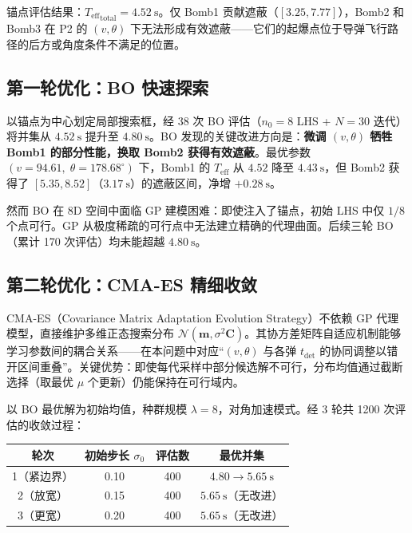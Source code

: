 \documentclass[12pt,a4paper]{ctexart}
\newcommand{\tdet}{t_{\text{det}}}
\newcommand{\Teff}{T_{\text{eff}}}
\begin{document}
锚点评估结果：${\Teff}_{\text{total}} = 4.52\ \mathrm{s}$。仅 Bomb1 贡献遮蔽（$[3.25, 7.77]$），Bomb2 和 Bomb3 在 P2 的 $(v,\theta)$ 下无法形成有效遮蔽——它们的起爆点位于导弹飞行路径的后方或角度条件不满足的位置。

\subsection{第一轮优化：BO 快速探索}

以锚点为中心划定局部搜索框，经 38 次 BO 评估（$n_0=8$ LHS + $N=30$ 迭代）将并集从 $4.52\ \mathrm{s}$ 提升至 $4.80\ \mathrm{s}$。BO 发现的关键改进方向是：\textbf{微调 $(v,\theta)$ 牺牲 Bomb1 的部分性能，换取 Bomb2 获得有效遮蔽}。最优参数 $(v=94.61,\; \theta=178.68^\circ)$ 下，Bomb1 的 $\Teff$ 从 $4.52$ 降至 $4.43\ \mathrm{s}$，但 Bomb2 获得了 $[5.35, 8.52]$（$3.17\ \mathrm{s}$）的遮蔽区间，净增 $+0.28\ \mathrm{s}$。

然而 BO 在 8D 空间中面临 GP 建模困难：即使注入了锚点，初始 LHS 中仅 $1/8$ 个点可行。GP 从极度稀疏的可行点中无法建立精确的代理曲面。后续三轮 BO（累计 170 次评估）均未能超越 $4.80\ \mathrm{s}$。

\subsection{第二轮优化：CMA-ES 精细收敛}

CMA-ES（Covariance Matrix Adaptation Evolution Strategy）不依赖 GP 代理模型，直接维护多维正态搜索分布 $\mathcal{N}(\mathbf{m}, \sigma^2\mathbf{C})$。其协方差矩阵自适应机制能够学习参数间的耦合关系——在本问题中对应``$(v,\theta)$ 与各弹 $\tdet$ 的协同调整以错开区间重叠''。关键优势：即使每代采样中部分候选解不可行，分布均值通过截断选择（取最优 $\mu$ 个更新）仍能保持在可行域内。

以 BO 最优解为初始均值，种群规模 $\lambda = 8$，对角加速模式。经 3 轮共 1200 次评估的收敛过程：

\begin{center}
\begin{tabular}{c|c|c|c}
\toprule
\textbf{轮次} & \textbf{初始步长} $\sigma_0$ & \textbf{评估数} & \textbf{最优并集} \\
\midrule
1（紧边界） & 0.10 & 400 & $4.80 \to 5.65\ \mathrm{s}$ \\
2（放宽）   & 0.15 & 400 & $5.65\ \mathrm{s}$（无改进）\\
3（更宽）   & 0.20 & 400 & $5.65\ \mathrm{s}$（无改进）\\
\bottomrule
\end{tabular}
\end{center}
\end{document}
